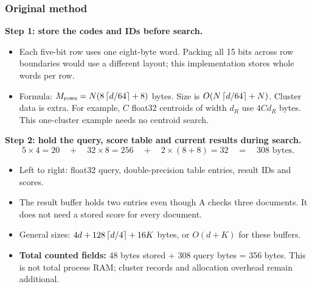 \subsubsection{Original method}
\textbf{Step 1: store the codes and IDs before search.}
\begin{center}
\end{center}
\begin{itemize}
\item Each five-bit row uses one eight-byte word. Packing all 15 bits across row boundaries
would use a different layout; this implementation stores whole words per row.
\item Formula: $M_{\rm rows}=N(8\left\lceil d/64\right\rceil+8)$ bytes. Size is $O(N\left\lceil d/64\right\rceil+N)$. Cluster data is extra. For example, $C$ float32 centroids of width $d_R$ use $4Cd_R$ bytes.
This one-cluster example needs no centroid search.
\end{itemize}

\textbf{Step 2: hold the query, score table and current results during search.}
\[
 \boxed{5\times4=20}\quad+\quad
 \boxed{32\times8=256}\quad+\quad
 \boxed{2\times(8+8)=32}\quad=\quad308\text{ bytes}.
\]
\begin{itemize}
\item Left to right: float32 query, double-precision table entries, result IDs and scores.
\item The result buffer holds two entries even though A checks three documents. It does not
need a stored score for every document.
\item General sizes: $4d+128\left\lceil d/4\right\rceil+16K$ bytes, or $O(d+K)$ for these buffers.
\end{itemize}
\begin{itemize}
\item \textbf{Total counted fields:} 48 bytes stored + 308 query bytes = 356 bytes. This is not total process RAM; cluster records and allocation overhead remain additional.
\end{itemize}

